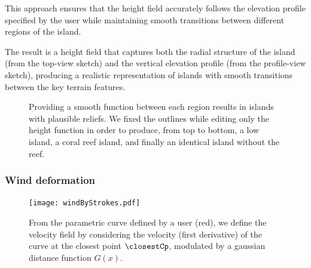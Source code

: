 This approach ensures that the height field accurately follows the elevation profile specified by the user while maintaining smooth transitions between different regions of the island.


The result is a height field that captures both the radial structure of the island (from the top-view sketch) and the vertical elevation profile (from the profile-view sketch), producing a realistic representation of islands with smooth transitions between the key terrain features.

\begin{figure}[H]
    \caption{Providing a smooth function between each region results in islands with plausible reliefs. We fixed the outlines while editing only the height function in order to produce, from top to bottom, a low island, a coral reef island, and finally an identical island without the reef. }
    \label{fig:coral-island-procedural-smooth-heights}
\end{figure}





\subsubsection{Wind deformation}
\label{sec:coral-island-wind-deformation}

\begin{figure}[H]
    \centering
    \texttt{[image: windByStrokes.pdf]}
    \caption{From the parametric curve defined by a user (red), we define the velocity field by considering the velocity (first derivative) of the curve at the closest point $\closestCp$, modulated by a gaussian distance function $G(x)$. }
    \label{fig:coral-island-wind-from-strokes}
\end{figure}

